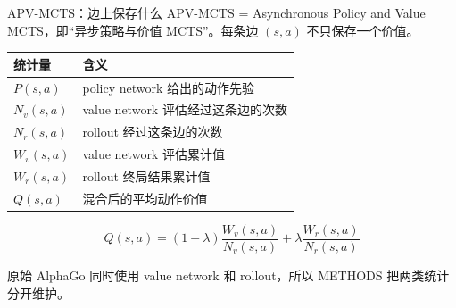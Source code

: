 \documentclass[UTF8,aspectratio=169,10pt]{ctexbeamer}
\begin{document}
\begin{frame}{APV-MCTS：边上保存什么}
  APV-MCTS = Asynchronous Policy and Value MCTS，即“异步策略与价值 MCTS”。每条边 $(s,a)$ 不只保存一个价值。

  \vspace{0.1cm}
  \begin{center}
    \begin{tabular}{ll}
      \toprule
      统计量 & 含义 \\
      \midrule
      $P(s,a)$ & policy network 给出的动作先验 \\
      $N_v(s,a)$ & value network 评估经过这条边的次数 \\
      $N_r(s,a)$ & rollout 经过这条边的次数 \\
      $W_v(s,a)$ & value network 评估累计值 \\
      $W_r(s,a)$ & rollout 终局结果累计值 \\
      $Q(s,a)$ & 混合后的平均动作价值 \\
      \bottomrule
    \end{tabular}
  \end{center}

  \[
    Q(s,a)=(1-\lambda)\frac{W_v(s,a)}{N_v(s,a)}
    +\lambda\frac{W_r(s,a)}{N_r(s,a)}
  \]

  \begin{center}
    \small
    原始 AlphaGo 同时使用 value network 和 rollout，所以 METHODS 把两类统计分开维护。
  \end{center}
\end{frame}
\end{document}

